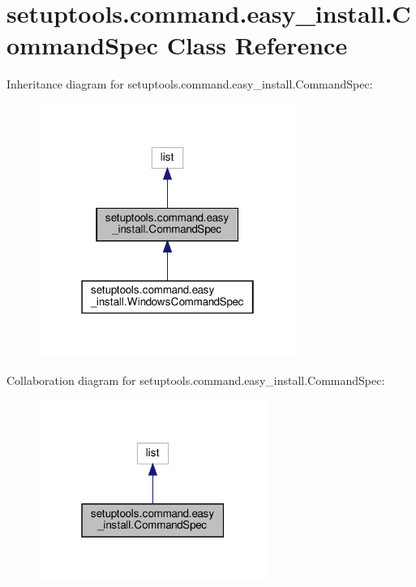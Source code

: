 \hypertarget{classsetuptools_1_1command_1_1easy__install_1_1CommandSpec}{}\section{setuptools.\+command.\+easy\+\_\+install.\+Command\+Spec Class Reference}
\label{classsetuptools_1_1command_1_1easy__install_1_1CommandSpec}


Inheritance diagram for setuptools.\+command.\+easy\+\_\+install.\+Command\+Spec\+:
\nopagebreak
\begin{figure}[H]
\begin{center}
\leavevmode
\includegraphics[width=238pt]{classsetuptools_1_1command_1_1easy__install_1_1CommandSpec__inherit__graph}
\end{center}
\end{figure}


Collaboration diagram for setuptools.\+command.\+easy\+\_\+install.\+Command\+Spec\+:
\nopagebreak
\begin{figure}[H]
\begin{center}
\leavevmode
\includegraphics[width=211pt]{classsetuptools_1_1command_1_1easy__install_1_1CommandSpec__coll__graph}
\end{center}
\end{figure}
